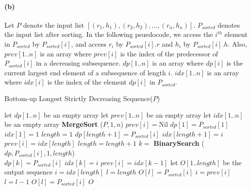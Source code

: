 \documentclass[12pt]{article}
\begin{document}
\paragraph{(b)} Let \(P\) denote the input list \([(r_1,h_1), (r_2,h_2), \hdots, (r_n,h_n)]\). \(P_{sorted}\) denotes the input list after sorting. In the following psuedocode, we access the \(i^{th}\) element in \(P_{sorted}\) by \(P_{sorted}[i]\), and access \(r_i\) by \(P_{sorted}[i].r\) and  \(h_i\) by \(P_{sorted}[i].h\). Also, \(prev[1..n]\) is an array where \(prev[i]\) is the index of the predecessor of \(P_{sorted}[i]\) in a decreasing subsequence. \(dp[1..n]\) is an array where \(dp[i]\) is the current largest end element of a subsequence of length \(i\). \(idx[1..n]\) is an array where \(idx[i]\) is the index of the element \(dp[i]\) in \(P_{sorted}\).
\begin{algorithm}[H]
     \caption{Bottom-up Longest Strictly Decreasing Sequence(\(P\))}
     \begin{algorithmic}[1]
     \State let \(dp[1..n]\) be an empty array 
     \State let \(prev[1..n]\) be an empty array
     \State let \(idx[1..n]\) be an empty array
     \State \textbf{MergeSort} (\(P, 1, n\))
          \State \(prev[i] = \text{Nil}\)
     \EndFor
     \State \(dp[1] = P_{sorted}[1]\) 
     \State \(idx[1] = 1\)
     \State \(length = 1\) 
           
               \State \(dp[length+1] = P_{sorted}[i]\)
               \State \(idx[length+1] = i\)
               \State \(prev[i] = idx[length]\)
               \State \(length = length + 1\)
          \Else
               \State \(k =\) \textbf{BinarySearch} (\(dp, P_{sorted}[i], 1, length\)) \\
                
                    \State \(dp[k] = P_{sorted}[i]\) 
                    \State \(idx[k] = i\)
                     
                         \State \(prev[i] = idx[k-1]\)
                    \EndIf
               \EndIf
          \EndIf
     \EndFor
     \State let \(O[1..length]\) be the output sequence
     \State \(i = idx[length]\) 
     \State \(l = length\)
      
          \State \(O[l] = P_{sorted}[i]\)
          \State \(i = prev[i]\)
          \State \(l = l - 1\)
     \EndWhile
     \State \(O[l] = P_{sorted}[i]\)
     \State \Return \(O\)
     \end{algorithmic}
\end{algorithm}
\end{document}
